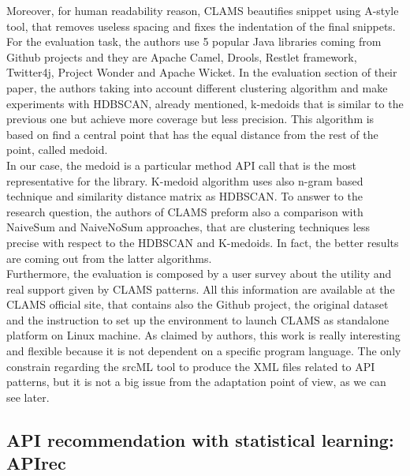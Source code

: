 Moreover, for human readability reason, CLAMS beautifies snippet using A-style tool, that removes useless spacing and fixes the indentation of the final snippets. For the evaluation task, the authors use 5 popular Java libraries coming from Github projects and they are Apache Camel, Drools, Restlet framework, Twitter4j, Project Wonder and Apache Wicket. In the evaluation section of their paper, the authors taking into account different clustering algorithm and make experiments with HDBSCAN, already mentioned, k-medoids that is similar to the previous one but achieve more coverage but less precision. This algorithm is based on find a central point that has the equal distance from the rest of the point, called medoid. \\
In our case, the medoid is a particular method API call that is the most representative for the library. K-medoid algorithm uses also n-gram based technique and similarity distance matrix as HDBSCAN. To answer to the research question, the authors of CLAMS preform also a comparison with NaiveSum and NaiveNoSum approaches, that are clustering techniques less precise with respect to the HDBSCAN and K-medoids. In fact, the better results are coming out from the latter algorithms. \\
Furthermore, the evaluation is composed by a user survey about the utility and real support given by CLAMS patterns. All this information are available at the CLAMS official site, that contains also the Github project, the original dataset and the instruction to set up the environment to launch CLAMS as standalone platform on Linux machine. As claimed by authors, this work is really interesting and flexible because it is not dependent on a specific program language. The only constrain regarding the srcML tool to produce the XML files related to API patterns, but it is not a big issue from the adaptation point of view, as we can see later.



\subsection{API recommendation with statistical learning: APIrec}

